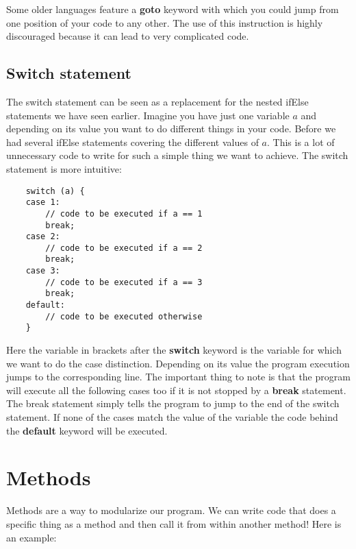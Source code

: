 \documentclass{scrreprt}
\begin{document}
Some older languages feature a \textbf{goto} keyword with which you could jump from one position of your code to any other. The use of this instruction is highly discouraged because it can lead to very complicated code.

\subsection{Switch statement}
The switch statement can be seen as a replacement for the nested ifElse statements we have seen earlier. Imagine you have just one variable $a$ and depending on its value you want to do different things in your code. Before we had several ifElse statements covering the different values of $a$. This is a lot of unnecessary code to write for such a simple thing we want to achieve. The switch statement is more intuitive:
 \lstset{language=Java}
\begin{lstlisting}
	switch (a) {
	case 1:
		// code to be executed if a == 1
		break;
	case 2:
		// code to be executed if a == 2
		break;
	case 3:
		// code to be executed if a == 3
		break;
	default:
		// code to be executed otherwise
	}
\end{lstlisting}
Here the variable in brackets after the \textbf{switch} keyword is the variable for which we want to do the case distinction. Depending on its value the program execution jumps to the corresponding line. The important thing to note is that the program will execute all the following cases too if it is not stopped by a \textbf{break} statement. The break statement simply tells the program to jump to the end of the switch statement. If none of the cases match the value of the variable the code behind the \textbf{default} keyword will be executed.

\section{Methods}
Methods are a way to modularize our program. We can write code that does a specific thing as a method and then call it from within another method! Here is an example:
\end{document}
